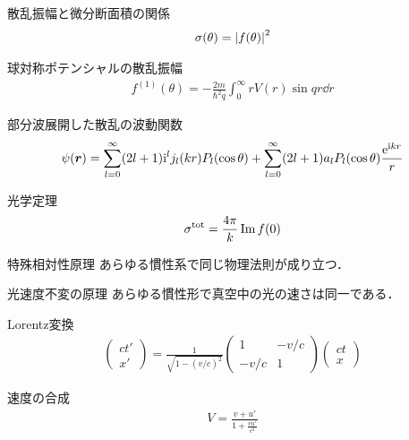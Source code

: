 \documentclass{report}
\begin{document}
  \begin{itembox}[l]{散乱振幅と微分断面積の関係}
    \begin{align*}
      \sigma(\theta) = \abs{f(\theta)}^2
    \end{align*}
  \end{itembox}
  \begin{itembox}[l]{球対称ポテンシャルの散乱振幅}
    \begin{align*}
      f^{(1)}(\theta) =  -\frac{2m}{\hbar^2 q} \int_{0}^{\infty} rV(r)\sin qr \dd{r}
    \end{align*}
  \end{itembox}
  \begin{itembox}[l]{部分波展開した散乱の波動関数}
    \begin{align*}
      \psi(\bm{r}) = \sum_{l=0}^{\infty} (2l+1)\mathrm{i}^l j_l(kr)P_l(\cos\theta) + \sum_{l=0}^{\infty} (2l+1)a_l P_l(\cos\theta) \frac{\mathrm{e}^{\mathrm{i} kr}}{r}
    \end{align*}
  \end{itembox}
  \begin{itembox}[l]{光学定理}
    \begin{align*}
      \sigma^{\mathrm{tot}} = \frac{4\pi}{k} \Im f(0)
    \end{align*}
  \end{itembox}
  \begin{itembox}[l]{特殊相対性原理}
    あらゆる慣性系で同じ物理法則が成り立つ．
  \end{itembox}
  \begin{itembox}[l]{光速度不変の原理}
    あらゆる慣性形で真空中の光の速さは同一である．
  \end{itembox}
  \begin{itembox}[l]{Lorentz変換}
    \begin{align*}
      \begin{pmatrix}
        ct' \\ x'
      \end{pmatrix}
      =
      \frac{1}{\sqrt{1 - (v/c)^2}}
      \begin{pmatrix}
        1 & -v/c\\
        -v/c & 1
      \end{pmatrix}
      \begin{pmatrix}
        ct\\x
      \end{pmatrix}
    \end{align*}
  \end{itembox}
  \begin{itembox}[l]{速度の合成}
    \begin{align*}
      V = \frac{v + u'}{1 + \frac{vu'}{c^2}}
    \end{align*}
  \end{itembox}
\end{document}

